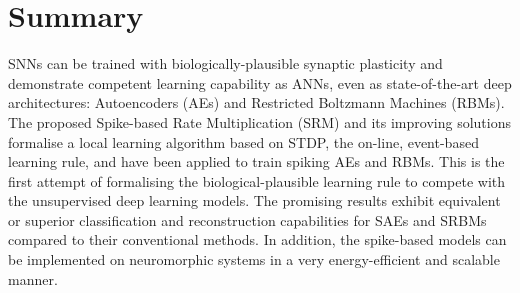 

\section{Summary}
SNNs can be trained with biologically-plausible synaptic plasticity and demonstrate competent learning capability as ANNs, even as state-of-the-art deep architectures: Autoencoders (AEs) and Restricted Boltzmann Machines (RBMs).
The proposed Spike-based Rate Multiplication (SRM) and its improving solutions formalise a local learning algorithm based on STDP, the on-line, event-based learning rule, and have been applied to train spiking AEs and RBMs.
This is the first attempt of formalising the biological-plausible learning rule to compete with the unsupervised deep learning models.
The promising results exhibit equivalent or superior classification and reconstruction capabilities for SAEs and SRBMs compared to their conventional methods.
In addition, the spike-based models can be implemented on neuromorphic systems in a very energy-efficient and scalable manner.

